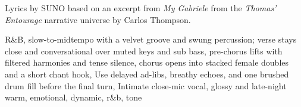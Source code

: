 
\begin{notes}
Lyrics by SUNO based on an excerpt from \emph{My Gabriele} from the \emph{Thomas’ Entourage} narrative universe by Carlos Thompson.
\end{notes}
\begin{style}
R\&B, slow-to-midtempo with a velvet groove and swung percussion; verse stays close and conversational over muted keys and sub bass, pre-chorus lifts with filtered harmonies and tense silence, chorus opens into stacked female doubles and a short chant hook, Use delayed ad-libs, breathy echoes, and one brushed drum fill before the final turn, Intimate close-mic vocal, glossy and late-night warm, emotional, dynamic, r\&b, tone
\end{style}
